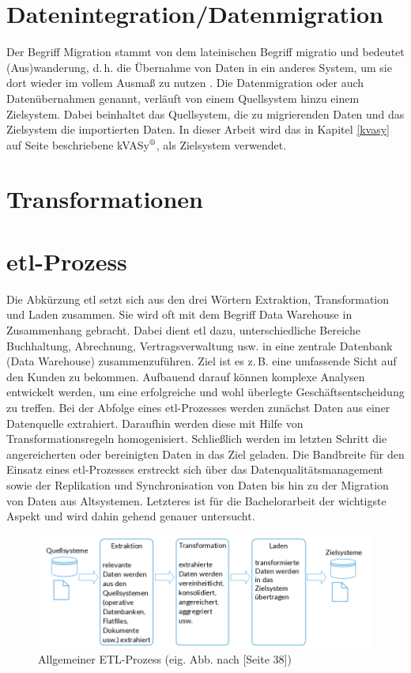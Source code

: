 \section{Datenintegration/Datenmigration}
Der Begriff Migration stammt von dem lateinischen Begriff migratio und bedeutet (Aus)wanderung, d.\,h. die Übernahme von
Daten in ein anderes System, um sie dort wieder im vollem Ausmaß zu nutzen \cite{duden:migra}.
Die Datenmigration oder auch Datenübernahmen genannt, verläuft von einem Quellsystem hinzu einem Zielsystem. Dabei beinhaltet das Quellsystem, die zu migrierenden Daten und das Zielsystem die importierten Daten. In dieser Arbeit wird das in Kapitel \ref{kvasy} auf Seite \pageref{kvasy} beschriebene kVASy$^\text{\textregistered}$, als Zielsystem verwendet.

\section{Transformationen}

\section{\acrshort{etl}-Prozess}
Die Abkürzung \acrshort{etl} setzt sich aus den drei Wörtern Extraktion, Transformation und Laden zusammen. Sie wird oft mit dem Begriff Data Warehouse in Zusammenhang gebracht. Dabei dient \acrshort{etl} dazu, unterschiedliche Bereiche Buchhaltung, Abrechnung, Vertragsverwaltung usw. in eine zentrale Datenbank (Data Warehouse) zusammenzuführen. Ziel ist es z.\,B. eine umfassende Sicht auf den Kunden zu bekommen. Aufbauend darauf können komplexe Analysen entwickelt werden, um eine erfolgreiche und wohl überlegte Geschäftsentscheidung zu treffen. Bei der Abfolge eines \acrshort{etl}-Prozesses werden zunächst Daten aus einer Datenquelle extrahiert. Daraufhin werden diese mit Hilfe von Transformationsregeln homogenisiert. Schließlich werden im letzten Schritt die angereicherten oder bereinigten Daten in das Ziel geladen. Die Bandbreite für den Einsatz eines \acrshort{etl}-Prozesses erstreckt sich über das Datenqualitätsmanagement sowie der Replikation und Synchronisation von Daten bis hin zu der Migration von Daten aus Altsystemen. Letzteres ist für die Bachelorarbeit der wichtigste Aspekt und wird dahin gehend genauer untersucht. \cite{Rossak2013}
\begin{figure}[ht]
	\begin{center}
		\includegraphics[scale=0.65]{bilder/ETL-Prozess.png}
		\caption{Allgemeiner ETL-Prozess (eig. Abb. nach \cite{Rossak2013}[Seite 38])}
		\label{pic:ETL:Pro}
	\end{center}
\end{figure}

